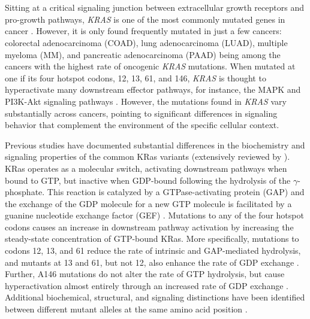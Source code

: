 \documentclass[english, 10pt, letterpaper]{article}
\newcommand{\KRAS}{\emph{KRAS}}
\newcommand{\kras}{KRas}
\begin{document}

\section*{}

Sitting at a critical signaling junction between extracellular growth receptors and pro-growth pathways, \KRAS{} is one of the most commonly mutated genes in cancer \cite{Simanshu2017, Bailey2018}.
However, it is only found frequently mutated in just a few cancers: colorectal adenocarcinoma (COAD), lung adenocarcinoma (LUAD), multiple myeloma (MM), and pancreatic adenocarcinoma (PAAD) being among the cancers with the highest rate of oncogenic \KRAS{} mutations.
When mutated at one if its four hotspot codons, 12, 13, 61, and 146, \KRAS{} is thought to hyperactivate many downstream effector pathways, for instance, the MAPK and PI3K-Akt signaling pathways \cite{Simanshu2017}.
However, the mutations found in \KRAS{} vary substantially across cancers, pointing to significant differences in signaling behavior that complement the environment of the specific cellular context.

Previous studies have documented substantial differences in the biochemistry and signaling properties of the common \kras{} variants (extensively reviewed by \cite{Miller2012, Li2018}).
\kras{} operates as a molecular switch, activating downstream pathways when bound to GTP, but inactive when GDP-bound following the hydrolysis of the $\gamma$-phosphate.
This reaction is catalyzed by a GTPase-activating protein (GAP) and the exchange of the GDP molecule for a new GTP molecule is facilitated by a guanine nucleotide exchange factor (GEF) \cite{Barbacid1987}.
Mutations to any of the four hotspot codons causes an increase in downstream pathway activation by increasing the steady-state concentration of GTP-bound \kras{}.
More specifically, mutations to codons 12, 13, and 61 reduce the rate of intrinsic and GAP-mediated hydrolysis, and mutants at 13 and 61, but not 12, also enhance the rate of GDP exchange \cite{Hunter2015a, Smith2013}.
Further, A146 mutations do not alter the rate of GTP hydrolysis, but cause hyperactivation almost entirely through an increased rate of GDP exchange \cite{Feig1988RelationshipProteins., Edkins2006, Janakiraman2010, Poulin2019}.
Additional biochemical, structural, and signaling distinctions have been identified between different mutant alleles at the same amino acid position \cite{Li2018, Hunter2015a, Poulin2019, Hobbs2019AtypicalCancer., Yu2018, Kovalski2019, Ihle2012, Spoerner2004, Smith2014a, Pantsar2018}.
\end{document}
